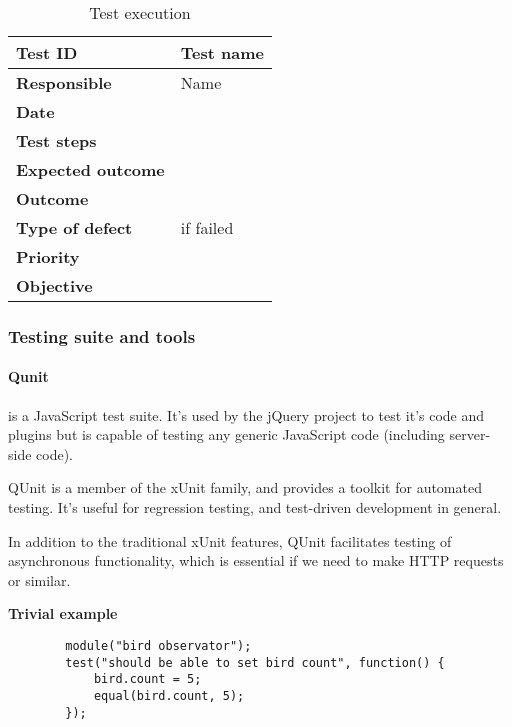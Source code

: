 \begin{table}[htb]
	\centering
    \begin{tabular}{| l | l |}
		\hline
		\textbf{Test ID} & Test name \\ \hline
		\textbf{Responsible} & Name \\ \hline
		\textbf{Date} & \\ \hline
		\textbf{Test steps} & \\ \hline
		\textbf{Expected outcome} & \\ \hline
		\textbf{Outcome} & \\ \hline
		\textbf{Type of defect} & if failed \\ \hline
		\textbf{Priority} & \\ \hline
		\textbf{Objective} &  \\ \hline
    \end{tabular}
  \caption{Test execution}
\end{table}



\subsubsection{Testing suite and tools}

	\paragraph{Qunit} is a JavaScript test suite. It's used by the jQuery project to test
	it's code and plugins but is capable of testing any generic JavaScript code
	(including server-side code). \cite{jquery:qunit}

	QUnit is a member of the xUnit family, and provides a toolkit for automated
	testing. It's useful for regression testing, and test-driven development in
	general.

	In addition to the traditional xUnit features, QUnit facilitates testing of
	asynchronous functionality, which is essential if we need to make HTTP
	requests or similar.

	\textbf{Trivial example}

	\begin{lstlisting}
		module("bird observator");
		test("should be able to set bird count", function() {
			bird.count = 5;
			equal(bird.count, 5);
		});
	\end{lstlisting}

